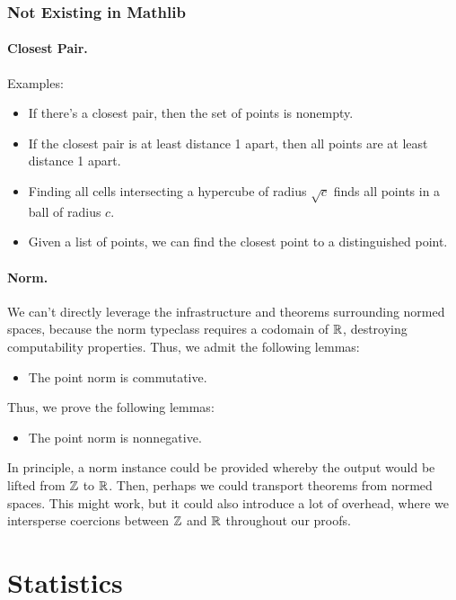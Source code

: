 \documentclass{article}
\begin{document}
\subsubsection{Not Existing in Mathlib}
\paragraph{Closest Pair.}
Examples:
\begin{itemize}
  \item If there's a closest pair, then the set of points is nonempty.
  \item If the closest pair is at least distance 1 apart, then all points are at least distance 1 apart.
  \item Finding all cells intersecting a hypercube of radius $\sqrt{c}$ finds all points in a ball of radius $c$.
  \item Given a list of points, we can find the closest point to a distinguished point.
\end{itemize}

\paragraph{Norm.}
We can't directly leverage the infrastructure and theorems surrounding normed spaces, because the norm typeclass requires a codomain of $\mathbb{R}$, destroying computability properties.
Thus, we admit the following lemmas:
\begin{itemize}
  \item The point norm is commutative.
\end{itemize}
Thus, we prove the following lemmas:
\begin{itemize}
  \item The point norm is nonnegative.
\end{itemize}
In principle, a norm instance could be provided whereby the output would be lifted from $\mathbb{Z}$ to $\mathbb{R}$.
Then, perhaps we could transport theorems from normed spaces.
This might work, but it could also introduce a lot of overhead, where we intersperse coercions between $\mathbb{Z}$ and $\mathbb{R}$ throughout our proofs.


\section{Statistics}
\end{document}
